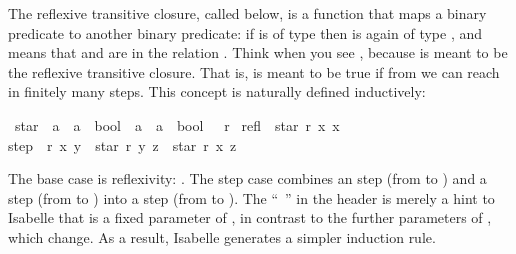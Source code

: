\begin{isabellebody}
\begin{isamarkuptext}
The reflexive transitive closure, called  below, is a function
that maps a binary predicate to another binary predicate: if  is of
type  then  is again of type , and  means that  and  are in
the relation . Think  when you see , because  is meant to be the reflexive transitive closure.
That is,  is meant to be true if from  we can
reach  in finitely many  steps. This concept is naturally
defined inductively:%
\end{isamarkuptext}%
\isamarkuptrue%
\isamarkupfalse%
\ star\ {}{}\ {}{}{}a\ {}\ {}a\ {}\ bool{}\ {}\ {}a\ {}\ {}a\ {}\ bool{}\ \ \ r\ \isanewline
refl{}\ \ {}star\ r\ x\ x{}\ {}\isanewline
step{}\ \ {}r\ x\ y\ {}\ star\ r\ y\ z\ {}\ star\ r\ x\ z{}%
\begin{isamarkuptext}%
The base case  is reflexivity: . The
step case  combines an  step (from  to
) and a  step (from  to ) into a
 step (from  to ).
The ``~'' in the header is merely a hint to Isabelle
that  is a fixed parameter of , in contrast to the
further parameters of , which change. As a result, Isabelle
generates a simpler induction rule.


\end{isamarkuptext}
\end{isabellebody}
